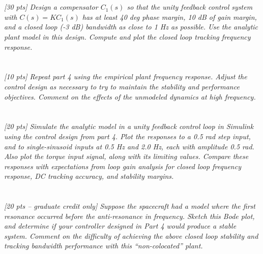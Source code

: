 \documentclass{article}
\begin{document}
\section{}

\textit{[30 pts] Design a compensator \(C_1(s)\) so that the unity feedback control system with \(C(s) = K C_1(s)\) has at least 40 deg phase margin, 10 dB of gain margin, and a closed loop (-3 dB) bandwidth as close to 1 Hz as possible. Use the analytic plant model in this design. Compute and plot the closed loop tracking frequency response.}

\section{}

\textit{[10 pts] Repeat part 4 using the empirical plant frequency response. Adjust the control design as necessary to try to maintain the stability and performance objectives. Comment on the effects of the unmodeled dynamics at high frequency.}

\section{}

\textit{[20 pts] Simulate the analytic model in a unity feedback control loop in Simulink using the control design from part 4. Plot the responses to a 0.5 rad step input, and to single-sinusoid inputs at 0.5 Hz and 2.0 Hz, each with amplitude 0.5 rad. Also plot the torque input signal, along with its limiting values. Compare these responses with expectations from loop gain analysis for closed loop frequency response, DC tracking accuracy, and stability margins.}

\section{}

\textit{[20 pts – graduate credit only] Suppose the spacecraft had a model where the first resonance occurred before the anti-resonance in frequency. Sketch this Bode plot, and determine if your controller designed in Part 4 would produce a stable system. Comment on the difficulty of achieving the above closed loop stability and tracking bandwidth performance with this “non-colocated” plant.}
\end{document}
